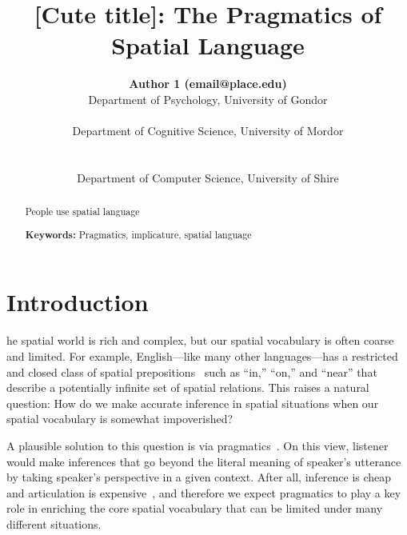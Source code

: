 \documentclass[10pt,letterpaper]{article}
\title{[Cute title]: The Pragmatics of Spatial Language}
\author{
{\large \bf Author 1 (email@place.edu)} \\
  Department of Psychology, University of Gondor\\
  \And{\large \bf Author 2 (email@place.edu)} \\
  Department of Cognitive Science, University of Mordor \\
  \\
 \AND{\large \bf Author 3 (email@people.edu)} \\
  Department of Computer Science, University of Shire\\
}
\begin{document}
\maketitle

\begin{abstract}
People use spatial language

\textbf{Keywords:} 
Pragmatics, implicature, spatial language
\end{abstract}

\section{Introduction}

he spatial world is rich and complex, but our spatial vocabulary is often coarse and limited. For example, English---like many other languages---has a restricted and closed class of spatial prepositions~\cite{talmy83,talmy00,landau93} such as ``in,'' ``on,'' and ``near'' that describe a potentially infinite set of spatial relations. This raises a natural question: How do we make accurate inference in spatial situations when our spatial vocabulary is somewhat impoverished?

A plausible solution to this question is via pragmatics~\cite{grice75,horn84}. On this view, listener would make inferences that go beyond the literal meaning of speaker's utterance by taking speaker's perspective in a given context. After all, inference is cheap and articulation is expensive~\cite{levinson00}, and therefore we expect pragmatics to play a key role in enriching the core spatial vocabulary that can be limited under many different situations. 
\end{document}
